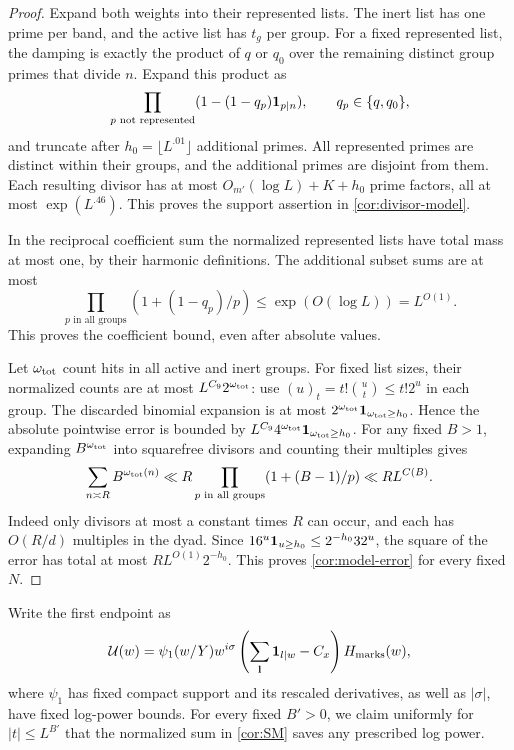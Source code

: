 \begin{proof}
Expand both weights into their represented lists.  The inert list has
one prime per band, and the active list has $t_g$ per group.  For a
fixed represented list, the damping is exactly the product of $q$
or $q_0$ over the remaining distinct group primes that divide $n$.
Expand this product as
\[
 \prod_{p\text{ not represented}}(1-(1-q_p)\mathbf{1}_{p\mid n}),
 \qquad q_p\in\{q,q_0\},
\]
and truncate after $h_0=\lfloor L^{.01}\rfloor$ additional primes.
All represented primes are distinct within their groups, and the
additional primes are disjoint from them.  Each resulting divisor has
at most $O_{m'}(\log L)+K+h_0$ prime factors, all at most
$\exp(L^{.46})$.  This proves the support assertion in
\eqref{cor:divisor-model}.

In the reciprocal coefficient sum the normalized represented lists
have total mass at most one, by their harmonic definitions.  The
additional subset sums are at most
\[
 \prod_{p\text{ in all groups}}(1+(1-q_p)/p)
       \leq\exp(O(\log L))=L^{O(1)}.
\]
This proves the coefficient bound, even after absolute values.

Let $\omega_{\rm tot}$ count hits in all active and inert groups.
For fixed list sizes, their normalized counts are at most
$L^{C_9}2^{\omega_{\rm tot}}$: use
$(u)_t=t!\binom ut\leq t!2^u$ in each group.  The discarded
binomial expansion is at most
$2^{\omega_{\rm tot}}\mathbf{1}_{\omega_{\rm tot}\geq h_0}$.
Hence the absolute pointwise error is bounded by
$L^{C_9}4^{\omega_{\rm tot}}\mathbf{1}_{\omega_{\rm tot}\geq h_0}$.
For any fixed $B>1$, expanding $B^{\omega_{\rm tot}}$ into
squarefree divisors and counting their multiples gives
\begin{equation}\label{cor:omega-moment}
 \sum_{n\asymp R}B^{\omega_{\rm tot}(n)}
 \ll R\prod_{p\text{ in all groups}}(1+(B-1)/p)
 \ll R L^{C(B)}.
\end{equation}
Indeed only divisors at most a constant times $R$ can occur, and each
has $O(R/d)$ multiples in the dyad.  Since
$16^u\mathbf{1}_{u\geq h_0}\leq2^{-h_0}32^u$, the square of the error
has total at most $R L^{O(1)}2^{-h_0}$.  This proves
\eqref{cor:model-error} for every fixed $N$.
\end{proof}

Write the first endpoint as
\begin{equation}\label{cor:U-form}
 \mathcal U(w)=\psi_1(w/Y)w^{i\sigma}
       \left(\sum_{\mathbf l}\mathbf{1}_{l\mid w}-C_x\right)
       H_{\rm marks}(w),
\end{equation}
where $\psi_1$ has fixed compact support and its rescaled derivatives,
as well as $|\sigma|$, have fixed log-power bounds.  For every fixed
$B'>0$, we claim uniformly for $|t|\leq L^{B'}$ that the normalized
sum in \eqref{cor:SM} saves any prescribed log power.

